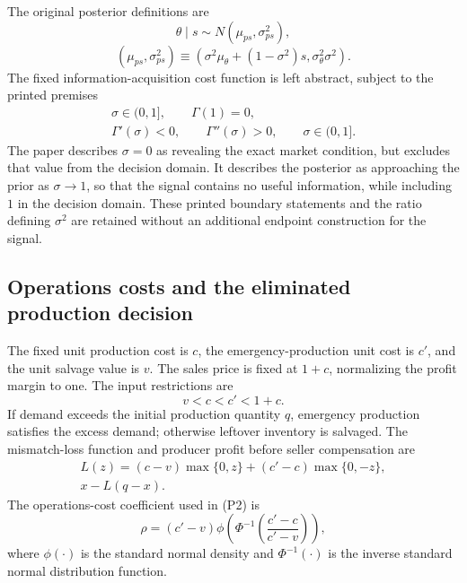 \documentclass{article}
\begin{document}
The original posterior definitions are
\begin{equation}
\theta\mid s\sim N(\mu_{ps},\sigma_{ps}^2),
\tag{1}
\end{equation}
\begin{equation}
(\mu_{ps},\sigma_{ps}^2)
\equiv\left(\sigma^2\mu_\theta+(1-\sigma^2)s,
\sigma_\theta^2\sigma^2\right).
\tag{2}
\end{equation}
The fixed information-acquisition cost function is left abstract, subject to the printed premises
\begin{gather*}
\sigma\in(0,1],\qquad \Gamma(1)=0,\\
\Gamma'(\sigma)<0,\qquad\Gamma''(\sigma)>0,
\qquad\sigma\in(0,1].
\end{gather*}
The paper describes $\sigma=0$ as revealing the exact market condition, but excludes that value from the decision domain. It describes the posterior as approaching the prior as $\sigma\to1$, so that the signal contains no useful information, while including $1$ in the decision domain. These printed boundary statements and the ratio defining $\sigma^2$ are retained without an additional endpoint construction for the signal.

\subsection*{Operations costs and the eliminated production decision}

The fixed unit production cost is $c$, the emergency-production unit cost is $c'$, and the unit salvage value is $v$. The sales price is fixed at $1+c$, normalizing the profit margin to one. The input restrictions are
\begin{equation*}
v<c<c'<1+c.
\end{equation*}
If demand exceeds the initial production quantity $q$, emergency production satisfies the excess demand; otherwise leftover inventory is salvaged. The mismatch-loss function and producer profit before seller compensation are
\begin{gather*}
L(z)=(c-v)\max\{0,z\}+(c'-c)\max\{0,-z\},\\
x-L(q-x).
\end{gather*}
The operations-cost coefficient used in (P2) is
\begin{equation*}
\rho=(c'-v)\phi\!\left(\Phi^{-1}\!\left(\frac{c'-c}{c'-v}\right)\right),
\end{equation*}
where $\phi(\cdot)$ is the standard normal density and $\Phi^{-1}(\cdot)$ is the inverse standard normal distribution function.
\end{document}

